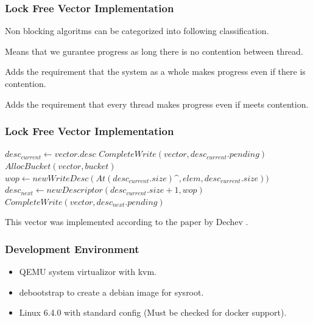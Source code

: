 \documentclass{beamer}
\begin{document}
\begin{frame}
    \frametitle{Lock Free Vector Implementation}
    Non blocking algoritms can be categorized into following classification.
    \begin{description}
        \item[Obstruction Freedom] Means that we gurantee progress as long
            there is no contention between thread.
        \item[Lock Freedom] Adds the requirement that the system as a whole
            makes progress even if there is contention.
        \item[Wait Freedom] Adds the requirement that every thread makes
            progress even if meets contention.
    \end{description}
\end{frame}

\begin{frame}
    \frametitle{Lock Free Vector Implementation}
    \begin{algorithmic}
        \Repeat
        \State $desc_{current} \gets vector.desc$
        \State $CompleteWrite(vector, desc_{current}.pending)$
        \State $AllocBucket(vector, bucket)$
        \EndIf
        \State $wop \gets new WriteDesc(At(desc_{current}.size)\^{}, elem,
        desc_{current}.size))$
        \State $desc_{next} \gets new Descriptor(desc_{current}.size + 1, wop)$
        \State $CompleteWrite(vector, desc_{next}.pending)$
    \end{algorithmic}
    This vector was implemented according to the paper by
    Dechev \cite{dechev2006lock}.
\end{frame}

\begin{frame}
    \frametitle{Development Environment}
    \begin{itemize}
        \item QEMU system virtualizor with kvm.
        \item debootstrap to create a debian image for sysroot.
        \item Linux 6.4.0 with standard config (Must be checked for docker
            support).
    \end{itemize}
\end{frame}
\end{document}
